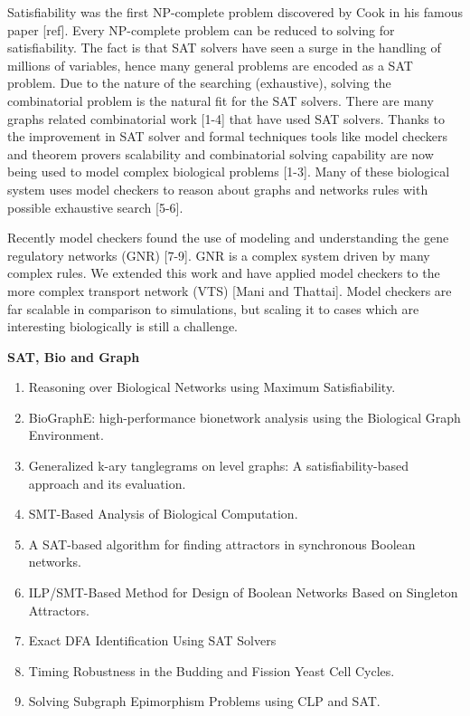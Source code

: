 

Satisfiability was the first NP-complete problem discovered by Cook in his famous paper [ref]. Every NP-complete problem can be reduced to solving for satisfiability. The fact is that SAT solvers have seen a surge in the handling of millions of variables, hence many general problems are encoded as a SAT problem. Due to the nature of the searching (exhaustive), solving the combinatorial problem is the natural fit for the SAT solvers. There are many graphs related combinatorial work [1-4] that have used SAT solvers. Thanks to the improvement in SAT solver and formal techniques tools like model checkers and theorem provers scalability and combinatorial solving capability are now being used to model complex biological problems [1-3].
Many of these biological system uses model checkers to reason about graphs and networks rules with possible exhaustive search [5-6].  

Recently model checkers found the use of modeling and understanding the gene regulatory networks (GNR) [7-9]. GNR is a complex system driven by many complex rules. We extended this work and have applied model checkers to the more complex transport network (VTS) [Mani and Thattai]. Model checkers are far scalable in comparison to simulations, but scaling it to cases which are interesting biologically is still a challenge.


\textbf{SAT, Bio and Graph}
\begin{enumerate}
\item Reasoning over Biological Networks using Maximum Satisfiability.
\item BioGraphE: high-performance bionetwork analysis using the Biological Graph Environment.
\item Generalized k-ary tanglegrams on level graphs: A satisfiability-based approach and its evaluation.
\item SMT-Based Analysis of Biological Computation.
\item A SAT-based algorithm for finding attractors in synchronous Boolean networks.
\item ILP/SMT-Based Method for Design of Boolean Networks Based on Singleton Attractors.
\item Exact DFA Identification Using SAT Solvers
\item Timing Robustness in the Budding and Fission Yeast Cell Cycles.
\item Solving Subgraph Epimorphism Problems using CLP
and SAT.
\end{enumerate}

